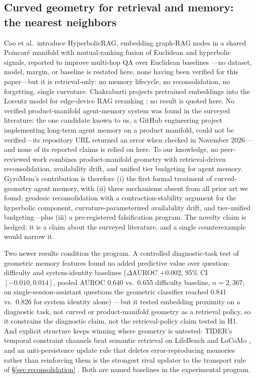 \documentclass[11pt,a4paper]{article}
\begin{document}
\subsection{Curved geometry for retrieval and memory: the nearest neighbors}
\label{sec:nearest}

Cao et al.\ introduce HyperbolicRAG, embedding graph-RAG nodes in a shared
Poincar\'e manifold with mutual-ranking fusion of Euclidean and hyperbolic
signals, reported to improve multi-hop QA over Euclidean baselines
\cite{hyperbolicrag}---no dataset, model, margin, or baseline is restated
here, none having been verified for this paper---but it is retrieval-only: no memory lifecycle, no
reconsolidation, no forgetting, single curvature. Chakrabarti projects
pretrained embeddings into the Lorentz model for edge-device RAG reranking
\cite{chakrabarti2026}; no result is quoted here. No verified
product-manifold agent-memory system was found in the surveyed
literature: the one candidate known to us, a GitHub engineering project
implementing long-term agent memory on a product manifold, could not be
verified---its repository URL returned an error when checked in November
2026---and none of its reported claims is relied on here. To our knowledge, no peer-reviewed
work combines product-manifold geometry with retrieval-driven
reconsolidation, availability drift, and unified tier budgeting for
agent memory. GyroMem's contribution is therefore (i) the first formal
treatment of curved-geometry agent memory, with (ii) three mechanisms
absent from all prior art we found: geodesic reconsolidation with a
contraction-stability argument for the hyperbolic component,
curvature-parameterized availability drift, and tier-unified budgeting---plus (iii) a pre-registered
falsification program. The novelty claim is hedged: it is a claim about
the surveyed literature, and a single counterexample would narrow it.

Two newer results condition the program. A controlled diagnostic-task
test of geometric memory features found no added predictive value over
question-difficulty and system-identity baselines ($\Delta$AUROC $+0.002$,
95\% CI $[-0.010, 0.014]$, pooled AUROC 0.640 vs.\ 0.655 difficulty
baseline, $n = 2{,}367$; on single-session-assistant questions the
geometric classifier reached 0.841 vs.\ 0.826 for system identity alone)
\cite{geometry}---but it tested embedding proximity on a diagnostic task,
not curved or product-manifold geometry as a retrieval policy, so it
constrains the diagnostic claim, not the retrieval-policy claim tested in
H1. And explicit structure keeps winning where geometry is untested:
TIDER's temporal constraint channels beat semantic retrieval on LifeBench
and LoCoMo \cite{tider}, and an anti-persistence update rule that deletes
error-reproducing memories rather than reinforcing them is the strongest
rival updater to the transport rule of \S\ref{sec:reconsolidation}
\cite{antipersistence}. Both are named baselines in the experimental
program.
\end{document}
